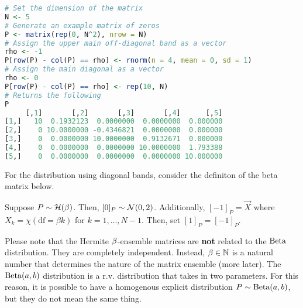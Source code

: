 \begin{lstlisting}[language=R]
# Set the dimension of the matrix
N <- 5
# Generate an example matrix of zeros
P <- matrix(rep(0, N^2), nrow = N)
# Assign the upper main off-diagonal band as a vector
rho <- -1
P[row(P) - col(P) == rho] <- rnorm(n = 4, mean = 0, sd = 1)
# Assign the main diagonal as a vector
rho <- 0
P[row(P) - col(P) == rho] <- rep(10, N)
# Returns the following
P
     [,1]       [,2]       [,3]       [,4]      [,5]
[1,]   10  0.1932123  0.0000000  0.0000000  0.000000
[2,]    0 10.0000000 -0.4346821  0.0000000  0.000000
[3,]    0  0.0000000 10.0000000  0.9132671  0.000000
[4,]    0  0.0000000  0.0000000 10.0000000  1.793388
[5,]    0  0.0000000  0.0000000  0.0000000 10.000000
\end{lstlisting}


%
%

For the distribution using diagonal bands, consider the definiton of the beta matrix below. %

\ALGbeta

\begin{definition}[$\b$-Matrix]
Suppose $P \sim \mathcal{H}(\beta)$. Then, $[0]_P \sim \mathcal{N}(0,2)$. Additionally, $[-1]_{P} = \vec{X}$ where $X_k = \chi(\text{df} = \beta k)$ for $k = 1,\dots,N-1$. Then, set $[1]_P = [-1]_P$.
\end{definition}

\begin{warning}[$\b$-Notation]
Please note that the Hermite $\b$-ensemble matrices are \textbf{not} related to the $\text{Beta}$ distribution. They are completely independent.
Instead, $\beta \in \mathbb{N}$ is a natural number that determines the nature of the matrix ensemble (more later). The $\text{Beta}(a,b)$ distribution is a r.v. distribution that
takes in two parameters. For this reason, it is possible to have a homogenous explicit distribution $P \sim \text{Beta}(a,b)$, but they do not mean the same thing.
\end{warning}

